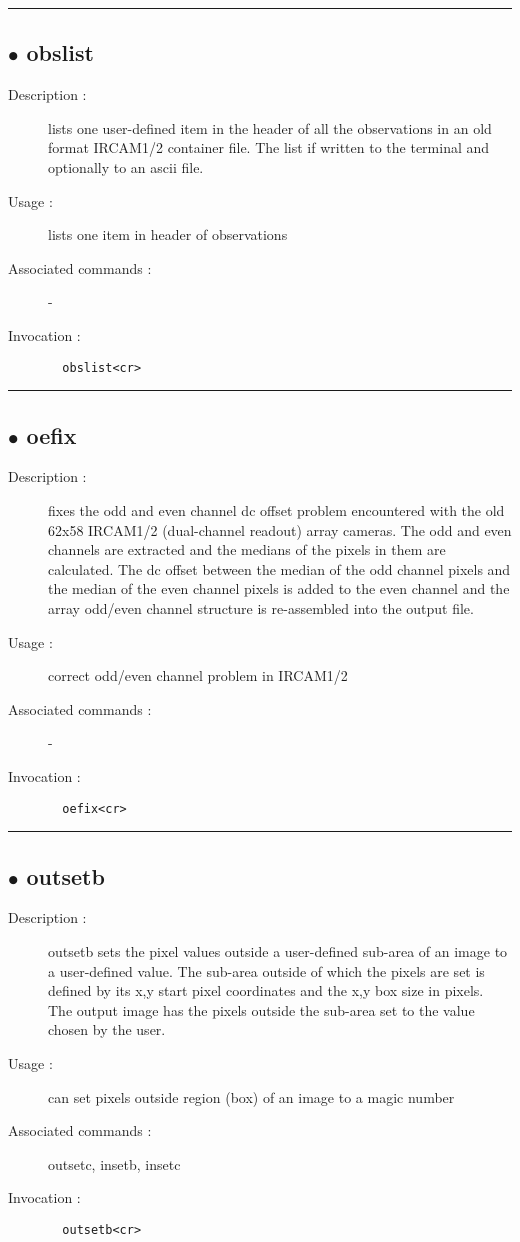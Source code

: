 \hrule \subsection*{$\bullet$ obslist}
\begin{description}
\item[Description :] lists one user-defined item in the header of all the
observations in an old format {\sc IRCAM1/2} container file.  The list if
written to the terminal and optionally to an ascii file.
\item[Usage :] lists one item in header of observations
\item[Associated commands :] -
\item[Invocation :]

\verb+  obslist<cr> +\end{description}

\hrule \subsection*{$\bullet$ oefix}
\begin{description}
\item[Description :] fixes the odd and even channel dc offset problem encountered with
the old 62x58 {\sc IRCAM1/2} (dual-channel readout) array cameras.  The odd and
even channels are extracted and the medians of the pixels in them are
calculated.  The dc offset between the median of the odd channel pixels
and the median of the even channel pixels is added to the even channel
and the array odd/even channel structure is re-assembled into the output
file.  
\item[Usage :] correct odd/even channel problem in {\sc IRCAM1/2}
\item[Associated commands :] -
\item[Invocation :]

\verb+  oefix<cr> +\end{description}

\hrule \subsection*{$\bullet$ outsetb}
\begin{description}
\item[Description :] outsetb sets the pixel values outside a user-defined sub-area
of an image to a user-defined value.  The sub-area outside of which the
pixels are set is defined by its x,y start pixel coordinates and the x,y
box size in pixels.  The output image has the pixels outside the sub-area
set to the value chosen by the user.
\item[Usage :] can set pixels outside region (box) of an image to a magic number
\item[Associated commands :] outsetc, insetb, insetc
\item[Invocation :]

\verb+  outsetb<cr> +\end{description}

